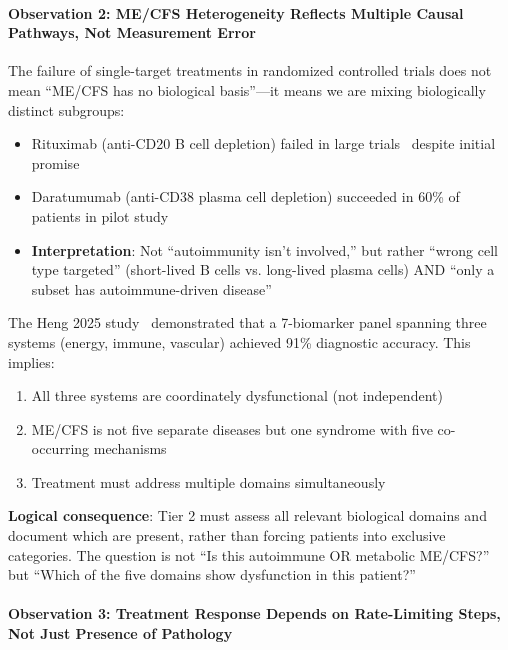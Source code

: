\paragraph{Observation 2: ME/CFS Heterogeneity Reflects Multiple Causal Pathways, Not Measurement Error}

The failure of single-target treatments in randomized controlled trials does not mean ``ME/CFS has no biological basis''---it means we are mixing biologically distinct subgroups:

\begin{itemize}
    \item Rituximab (anti-CD20 B cell depletion) failed in large trials~\cite{Fluge2015rituximab_rct} despite initial promise
    \item Daratumumab (anti-CD38 plasma cell depletion) succeeded in 60\% of patients in pilot study~\cite{Fluge2025daratumumab}
    \item \textbf{Interpretation}: Not ``autoimmunity isn't involved,'' but rather ``wrong cell type targeted'' (short-lived B cells vs. long-lived plasma cells) AND ``only a subset has autoimmune-driven disease''
\end{itemize}

The Heng 2025 study~\cite{heng2025mecfs} demonstrated that a 7-biomarker panel spanning three systems (energy, immune, vascular) achieved 91\% diagnostic accuracy. This implies:
\begin{enumerate}
    \item All three systems are coordinately dysfunctional (not independent)
    \item ME/CFS is not five separate diseases but one syndrome with five co-occurring mechanisms
    \item Treatment must address multiple domains simultaneously
\end{enumerate}

\textbf{Logical consequence}: Tier 2 must assess all relevant biological domains and document which are present, rather than forcing patients into exclusive categories. The question is not ``Is this autoimmune OR metabolic ME/CFS?'' but ``Which of the five domains show dysfunction in this patient?''

\paragraph{Observation 3: Treatment Response Depends on Rate-Limiting Steps, Not Just Presence of Pathology}

